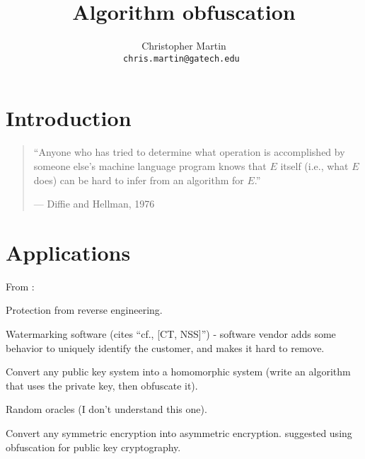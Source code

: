 \documentclass[10pt,twocolumn]{article}
\title{Algorithm obfuscation}
\date{}
\author{
  \begin{tabular}{c c c}
    Christopher Martin \\
    \small \tt{chris.martin@gatech.edu}
  \end{tabular}
}
\begin{document}
  \thispagestyle{empty}


  \section{Introduction}

    \begin{quote}
      ``Anyone who has tried to determine what operation is accomplished by someone else's machine language
      program knows that $E$ itself (i.e., what $E$ does) can be hard to infer from an algorithm for $E$.''

      \hfill --- Diffie and Hellman, 1976 \cite{newDirections}
    \end{quote}


  \section{Applications}

    From \cite{onThe(Im)possibility}:

    Protection from reverse engineering.

    Watermarking software (cites ``cf., [CT, NSS]'') -
    software vendor adds some behavior to uniquely identify the
    customer, and makes it hard to remove.

    Convert any public key system into a homomorphic system
    (write an algorithm that uses the private key, then obfuscate it).

    Random oracles (I don't understand this one).

    Convert any symmetric encryption into asymmetric encryption.
    \cite{newDirections} suggested using obfuscation for public key cryptography.
\end{document}
